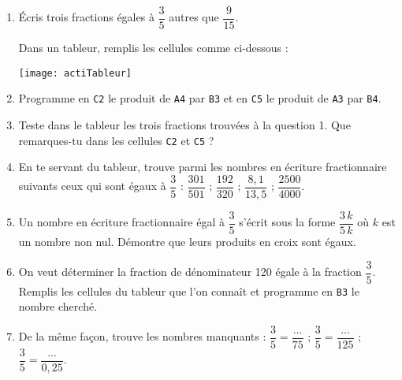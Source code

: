 \begin{activite}
\begin{enumerate}
\item Écris trois fractions égales à $\dfrac{3}{5}$ autres que $\dfrac{9}{15}$.

Dans un tableur, remplis les cellules comme ci-dessous :

\begin{center}
    \texttt{[image: actiTableur]}
\end{center}

\item Programme en \texttt{C2} le produit de \texttt{A4} par \texttt{B3} et en \texttt{C5} le produit de \texttt{A3} par \texttt{B4}.
\item Teste dans le tableur les trois fractions trouvées à la question 1. Que remarques-tu dans les cellules \texttt{C2} et \texttt{C5} ?
\item En te servant du tableur, trouve parmi les nombres en écriture fractionnaire suivants ceux qui sont égaux à $\dfrac{3}{5}$ : $\dfrac{301}{501}$ ; $\dfrac{192}{320}$ ; $\dfrac{8,1}{13,5}$ ; $\dfrac{2500}{4000}$.
\item Un nombre en écriture fractionnaire égal à $\dfrac{3}{5}$ s'écrit sous la forme $\dfrac{3\,k}{5\,k}$ où $k$ est un nombre non nul. Démontre que leurs produits en croix sont égaux.
\item On veut déterminer la fraction de dénominateur 120 égale à la fraction $\dfrac{3}{5}$. Remplis les cellules du tableur que l'on connaît et programme en \texttt{B3} le nombre cherché.
\item De la même façon, trouve les nombres manquants : $\dfrac{3}{5}=\dfrac{...}{75}$ ; $\dfrac{3}{5}=\dfrac{...}{125}$ ; $\dfrac{3}{5}=\dfrac{...}{0,25}$.
\end{enumerate}
\end{activite}




